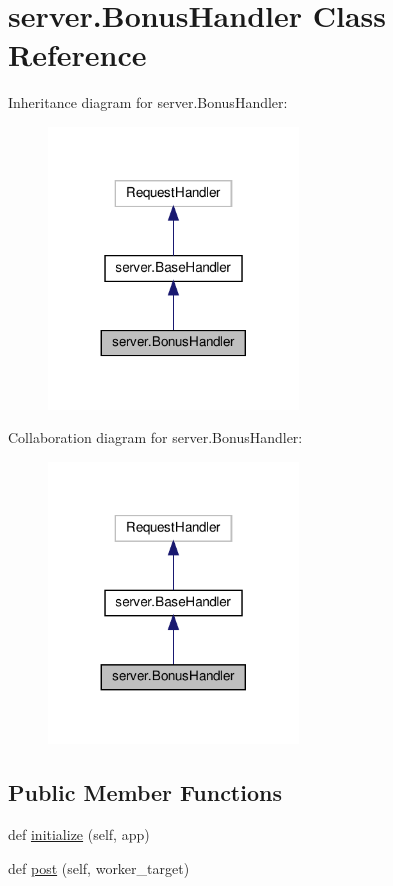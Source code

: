 \hypertarget{classserver_1_1BonusHandler}{}\section{server.\+Bonus\+Handler Class Reference}
\label{classserver_1_1BonusHandler}


Inheritance diagram for server.\+Bonus\+Handler\+:
\nopagebreak
\begin{figure}[H]
\begin{center}
\leavevmode
\includegraphics[width=188pt]{classserver_1_1BonusHandler__inherit__graph}
\end{center}
\end{figure}


Collaboration diagram for server.\+Bonus\+Handler\+:
\nopagebreak
\begin{figure}[H]
\begin{center}
\leavevmode
\includegraphics[width=188pt]{classserver_1_1BonusHandler__coll__graph}
\end{center}
\end{figure}
\subsection*{Public Member Functions}
\begin{DoxyCompactItemize}
\item 
def \hyperlink{classserver_1_1BonusHandler_aa0917e26df68d971bdcea1af70c72220}{initialize} (self, app)
\item 
def \hyperlink{classserver_1_1BonusHandler_a8bd13dda76f95db6e56f29d5a2e0a472}{post} (self, worker\+\_\+target)
\end{DoxyCompactItemize}
